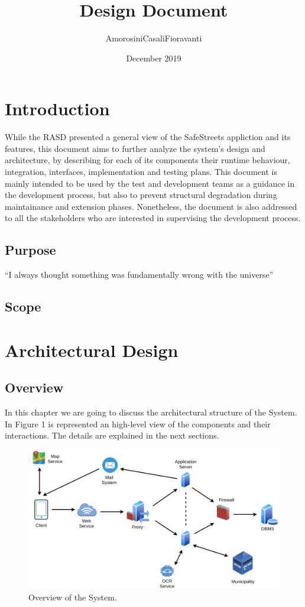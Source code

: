 \documentclass{report}
\title{Design Document}
\author{AmorosiniCasaliFioravanti}
\date{December 2019}
\begin{document}
\maketitle

\chapter{Introduction}
While the RASD presented a general view of the SafeStreets appliction and its features, this document aims to further analyze the system's design and architecture, by describing for each of its components their runtime behaviour, integration, interfaces, implementation and testing plans.
This document is mainly intended to be used by the test and development teams as a guidance in the development process, but also to prevent structural degradation during maintainance and extension phases. Nonetheless, the document is also addressed to all the stakeholders who are interested in supervising the development process.

\section{Purpose}
``I always thought something was fundamentally wrong with the universe'' 

\section{Scope}

\chapter{Architectural Design}
\section{Overview}
In this chapter we are going to discuss the architectural structure of the System. In Figure 1 is represented an high-level view of the components and their interactions. The details are explained in the next sections.
\begin{figure}[!ht]
	\begin{center}
	\includegraphics[width=\textwidth]{img/HighLevelOverview.png}
	\end{center}
	\caption{Overview of the System.}
\end{figure}
\end{document}

